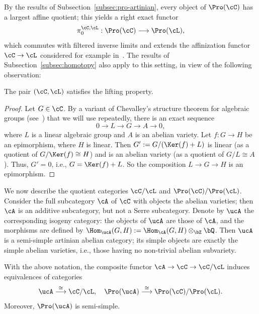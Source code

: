 By the results of Subsection~\ref{subsec:pro-artinian}, every object of $\Pro(\cC)$ has a largest affine quotient; this yields a right exact functor
\[
\pi_0^{\cC,\cL} : \Pro(\cC) \longrightarrow \Pro(\cL),
\]
which commutes with filtered inverse limits and extends the affinization functor $\cC \to \cL$ considered for example in~\cite[III.3.8]{DG}. The results of Subsection~\ref{subsec:homotopy} also apply to this setting, in view of the following observation:

\begin{lemm}\label{lem:CL}
The pair $(\cC,\cL)$ satisfies the lifting property.
\end{lemm}

\begin{proof}
Let $G \in \cC$. By a variant of Chevalley's structure theorem for algebraic groups (see~\cite[Thm.~2.3]{Br17a}) that we will use repeatedly, there is an exact sequence
\begin{equation}\label{eqn:LGA}
0 \longrightarrow L \longrightarrow G \longrightarrow A
\longrightarrow 0,
\end{equation}
where $L$ is a linear algebraic group and $A$ is an abelian variety. Let $f: G \to H$ be an epimorphism, where $H$ is linear. Then $G' := G/(\Ker(f) + L)$ is linear (as a quotient of $G/\Ker(f) \cong H$) and is an abelian variety (as a quotient of $G/L \cong A$). Thus, $G' = 0$, i.e., $G = \Ker(f) + L$. So the composition $L \to G \to H$ is an epimorphism.
\end{proof}

We now describe the quotient categories $\cC/\cL$ and $\Pro(\cC)/\Pro(\cL)$. Consider the full subcategory $\cA$ of $\cC$ with objects the abelian varieties; then $\cA$ is an additive subcategory, but not a Serre subcategory. Denote by $\ucA$ the corresponding isogeny category: the objects of $\ucA$ are those of $\cA$, and the morphisms are defined by $\Hom_{\ucA}(G,H) := \Hom_{\cA}(G,H) \otimes_{\bZ} \bQ$. Then $\ucA$ is a semi-simple artinian abelian category; its simple objects are exactly the simple abelian varieties, i.e., those having no non-trivial abelian subvariety.


\begin{lemm}\label{lem:isogeny}
With the above notation, the composite functor $\cA \to \cC \to \cC/\cL$ induces equivalences of categories
\[
\ucA \stackrel{\cong}{\longrightarrow} \cC/\cL,
\quad
\Pro(\ucA) \stackrel{\cong}{\longrightarrow}
\Pro(\cC)/\Pro(\cL).
\]
Moreover, $\Pro(\ucA)$ is semi-simple.
\end{lemm}

